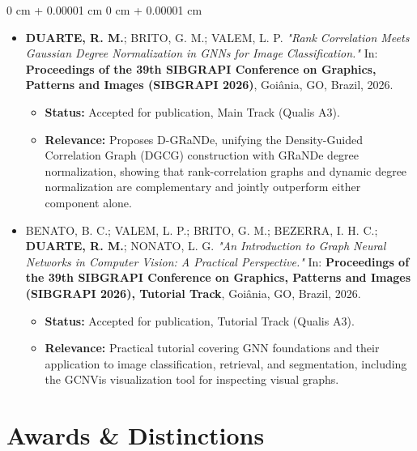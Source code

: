\documentclass[10pt, letterpaper]{article}
\newenvironment{highlightsforbulletentries}{
    \begin{itemize}[
        topsep=0.10 cm,
        parsep=0.10 cm,
        partopsep=0pt,
        itemsep=0pt,
        leftmargin=10pt
    ]
}{
    \end{itemize}
} %
\newenvironment{onecolentry}{
    \begin{adjustwidth}{
        0 cm + 0.00001 cm
    }{
        0 cm + 0.00001 cm
    }
}{
    \end{adjustwidth}
} %
\begin{document}
\begin{onecolentry}
\begin{highlightsforbulletentries}
    \item \textbf{DUARTE, R. M.}; BRITO, G. M.; VALEM, L. P. \textit{"Rank Correlation Meets Gaussian Degree Normalization in GNNs for Image Classification."} In: \textbf{Proceedings of the 39th SIBGRAPI Conference on Graphics, Patterns and Images (SIBGRAPI 2026)}, Goiânia, GO, Brazil, 2026.
    \begin{itemize}[topsep=0.05cm, parsep=0.05cm, leftmargin=0.5cm, label={--}]
        \item \textbf{Status:} Accepted for publication, Main Track (Qualis A3).
        \item \textbf{Relevance:} Proposes D-GRaNDe, unifying the Density-Guided Correlation Graph (DGCG) construction with GRaNDe degree normalization, showing that rank-correlation graphs and dynamic degree normalization are complementary and jointly outperform either component alone.
    \end{itemize}

    \vspace{0.15cm}

    \item BENATO, B. C.; VALEM, L. P.; BRITO, G. M.; BEZERRA, I. H. C.; \textbf{DUARTE, R. M.}; NONATO, L. G. \textit{"An Introduction to Graph Neural Networks in Computer Vision: A Practical Perspective."} In: \textbf{Proceedings of the 39th SIBGRAPI Conference on Graphics, Patterns and Images (SIBGRAPI 2026), Tutorial Track}, Goiânia, GO, Brazil, 2026.
    \begin{itemize}[topsep=0.05cm, parsep=0.05cm, leftmargin=0.5cm, label={--}]
        \item \textbf{Status:} Accepted for publication, Tutorial Track (Qualis A3).
        \item \textbf{Relevance:} Practical tutorial covering GNN foundations and their application to image classification, retrieval, and segmentation, including the GCNVis visualization tool for inspecting visual graphs.
    \end{itemize}
    \end{highlightsforbulletentries}
\end{onecolentry}

\vspace{0.15 cm}


\section{Awards \& Distinctions}
\end{document}
